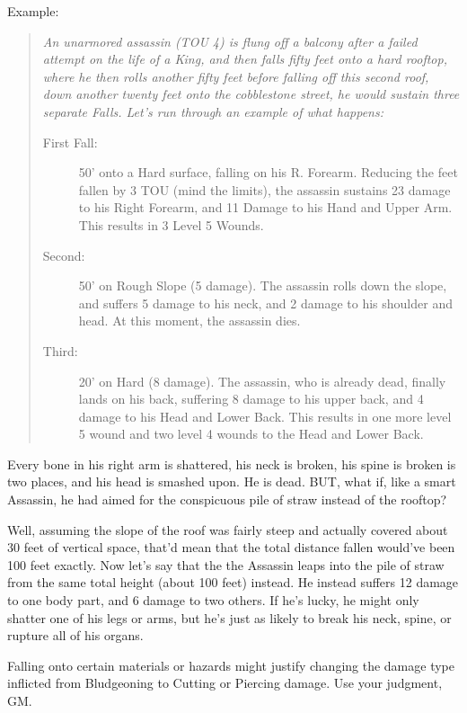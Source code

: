 \documentclass[oneside,11pt,english]{book}
\begin{document}
Example:
\begin{quotation} %
\emph{An unarmored assassin (TOU 4) is flung off a balcony after a failed attempt on the life
  of a King, and then falls fifty feet onto a hard rooftop, where he then rolls
  another fifty feet before falling off this second roof, down another twenty
  feet onto the cobblestone street, he would sustain three separate Falls. Let’s
  run through an example of what happens:}
\begin{description}
\item[First Fall:] 50’ onto a Hard surface, falling on his R. Forearm. Reducing the feet fallen by 3 TOU
  (mind the limits), the assassin sustains 23 damage to his Right Forearm, and 11
  Damage to his Hand and Upper Arm. This results in 3 Level 5 Wounds. 
\item[Second:] 50’ on Rough Slope (5 damage). The assassin rolls down the slope,
  and suffers 5 damage to his neck, and 2 damage to his shoulder and head. At
  this moment, the assassin dies. 
\item[Third:]  20’ on Hard (8 damage). The assassin, who is already dead, finally
  lands on his back, suffering 8 damage to his upper back, and 4 damage to his
  Head and Lower Back. This results in one more level 5 wound and two level 4
  wounds to the Head and Lower Back. 
\end{description}
\end{quotation}

Every bone in his right arm is shattered, his neck is broken, his spine is broken is two places, and his head
is smashed upon. He is dead. BUT, what if, like a smart Assassin, he had aimed for the conspicuous pile
of straw instead of the rooftop?

Well, assuming the slope of the roof was fairly steep and actually covered about 30 feet of
vertical space, that’d mean that the total distance fallen would’ve been 100 feet exactly.
Now let’s say that the the Assassin leaps into the pile of straw from the same total height (about
100 feet) instead. He instead suffers 12 damage to one body part, and 6 damage to two others. If he’s
lucky, he might only shatter one of his legs or arms, but he’s just as likely to break his neck, spine, or
rupture all of his organs.

Falling onto certain materials or hazards might justify changing the damage type
inflicted from Bludgeoning to Cutting or Piercing damage. Use your judgment, GM. 
\end{document}
